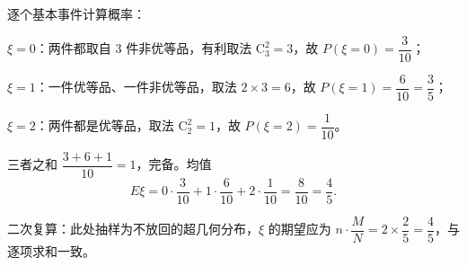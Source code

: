 \begin{answer}
逐个基本事件计算概率：

$\xi=0$：两件都取自 $3$ 件非优等品，有利取法 $\mathrm C_3^2=3$，故 $P(\xi=0)=\dfrac{3}{10}$；

$\xi=1$：一件优等品、一件非优等品，取法 $2\times3=6$，故 $P(\xi=1)=\dfrac{6}{10}=\dfrac35$；

$\xi=2$：两件都是优等品，取法 $\mathrm C_2^2=1$，故 $P(\xi=2)=\dfrac{1}{10}$。

三者之和 $\dfrac{3+6+1}{10}=1$，完备。均值
\nopagebreak[4]
\[E\xi=0\cdot\frac{3}{10}+1\cdot\frac{6}{10}+2\cdot\frac{1}{10}=\frac{8}{10}=\frac45.\]

二次复算：此处抽样为不放回的超几何分布，$\xi$ 的期望应为 $n\cdot\dfrac{M}{N}=2\times\dfrac25=\dfrac45$，与逐项求和一致。




\end{answer}
